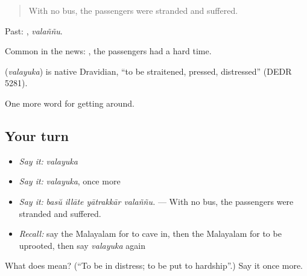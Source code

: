\begin{quote}
With no bus, the passengers were stranded and suffered.
\end{quote}

Past: , \emph{valaññu}.

Common in the news:  , the passengers had a hard time.

\begin{cousinweb}
\textbf{} (\emph{valayuka}) is native Dravidian, \textquotedblleft{}to be straitened, pressed, distressed\textquotedblright{} (DEDR 5281).
\end{cousinweb}

\begin{grammarlens}[title={What you've built}]
One more word for getting around.
\end{grammarlens}

\subsection*{Your turn}
\begin{itemize}
\raggedright
  \item \emph{Say it:} \emph{valayuka}
  \item \emph{Say it:} \emph{valayuka}, once more
  \item \emph{Say it:} \emph{basŭ illāte yātrakkār valaññu.} — With no bus, the passengers were stranded and suffered.
  \item \emph{Recall:} say the Malayalam for to cave in, then the Malayalam for to be uprooted, then say \emph{valayuka} again
\end{itemize}

\begin{tcolorbox}[breakable,colback=teal!4,colframe=teal!35!black,title={Before you move on}]
What does  mean? (\textquotedblleft{}To be in distress; to be put to hardship\textquotedblright{}.) Say it once more.
\end{tcolorbox}
